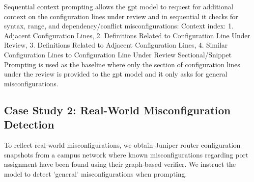 \begin{table}[ht]
\centering
\caption{Example LLM Reasoning for \sysname{}}
\end{table}


Sequential context prompting allows the gpt model to request for additional context on the configuration lines under review and in sequential it checks for syntax, range, and dependency/conflict misconfigurations:
Context index: 1. Adjacent Configuration Lines, 2. Definitions Related to Configuration Line Under Review, 3. Definitions Related to Adjacent Configuration Lines, 4. Similar Configuration Lines to Configuration Line Under Review
Sectional/Snippet Prompting is used as the baseline where only the section of configuration lines under the review is provided to the gpt model and it only asks for general misconfigurations.

\subsection{Case Study 2: Real-World Misconfiguration Detection}
To reflect real-world misconfigurations, we obtain Juniper router configuration snapshots from a campus network where known misconfigurations regarding port assignment have been found using their graph-based verifier. We instruct the model to detect 'general' misconfigurations when prompting.

